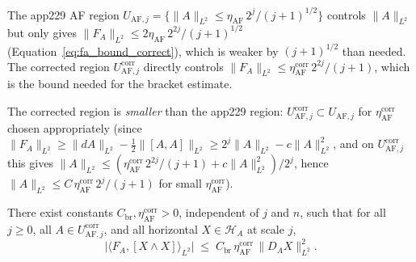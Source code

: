 \begin{remark}
\label{rem:af_comparison}
The app229 AF region
$U_{\mathrm{AF},j}=\{\|A\|_{L^{2}}\le\eta_{\mathrm{AF}}\,
2^{j}/(j+1)^{1/2}\}$ controls $\|A\|_{L^{2}}$ but only gives
$\|F_{A}\|_{L^{2}}\le 2\eta_{\mathrm{AF}}\,2^{2j}/(j+1)^{1/2}$
(Equation~\eqref{eq:fa_bound_correct}), which is weaker by
$(j+1)^{1/2}$ than needed. The corrected region
$U_{\mathrm{AF},j}^{\mathrm{corr}}$ directly controls
$\|F_{A}\|_{L^{2}}\le\eta_{\mathrm{AF}}^{\mathrm{corr}}\,
2^{2j}/(j+1)$, which is the bound needed for the bracket estimate.

The corrected region is \emph{smaller} than the app229 region:
$U_{\mathrm{AF},j}^{\mathrm{corr}}\subset U_{\mathrm{AF},j}$ for
$\eta_{\mathrm{AF}}^{\mathrm{corr}}$ chosen appropriately (since
$\|F_{A}\|_{L^{2}}\ge\|dA\|_{L^{2}}-\tfrac{1}{2}\|[A,A]\|_{L^{
\mathrm{2}}}\ge 2^{j}\|A\|_{L^{2}}-c\|A\|_{L^{2}}^{2}$, and on
$U_{\mathrm{AF},j}^{\mathrm{corr}}$ this gives
$\|A\|_{L^{2}}\le(\eta_{\mathrm{AF}}^{\mathrm{corr}}\,2^{2j}/(j+1)
+c\|A\|_{L^{2}}^{2})/2^{j}$, hence
$\|A\|_{L^{2}}\le C\,\eta_{\mathrm{AF}}^{\mathrm{corr}}\,
2^{j}/(j+1)$ for small $\eta_{\mathrm{AF}}^{\mathrm{corr}}$).
\end{remark}

\begin{lemma}
\label{lem:bracket_bound_corr}
There exist constants $C_{\mathrm{br}},\eta_{\mathrm{AF}}^{
\mathrm{corr}}>0$, independent of $j$ and $n$, such that for all
$j\ge 0$, all $A\in U_{\mathrm{AF},j}^{\mathrm{corr}}$, and all
horizontal $X\in\mathcal{H}_{A}$ at scale $j$,
\begin{equation}
\label{eq:bracket_bound_corr}
  \bigl|\langle F_{A},[X\wedge X]\rangle_{L^{2}}\bigr|
  \;\le\;C_{\mathrm{br}}\,\eta_{\mathrm{AF}}^{\mathrm{corr}}\,
  \|D_{A}X\|_{L^{2}}^{2}.
\end{equation}
\end{lemma}

